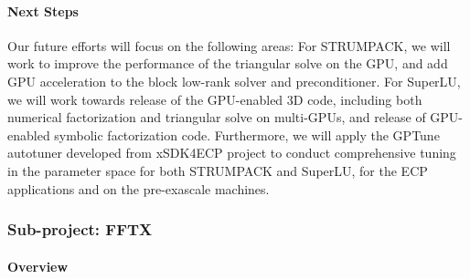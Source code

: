 \vspace{-.135in}
\paragraph{Next Steps} Our future efforts will focus on the following areas:
 For STRUMPACK, we will work to improve the performance of the
 triangular solve on the GPU, and add GPU acceleration to the block
 low-rank solver and preconditioner.
 For SuperLU, we will work towards release of the GPU-enabled 3D code, including both numerical
 factorization and triangular solve on multi-GPUs, and release of GPU-enabled symbolic
 factorization code.
 Furthermore, we will apply the GPTune autotuner developed from xSDK4ECP project to conduct comprehensive
 tuning in the parameter space for both STRUMPACK and SuperLU, for the ECP applications and
 on the pre-exascale machines.


\subsubsection{ Sub-project: FFTX} \label{subsubsect:fftx}
\noindent

\paragraph{Overview}

